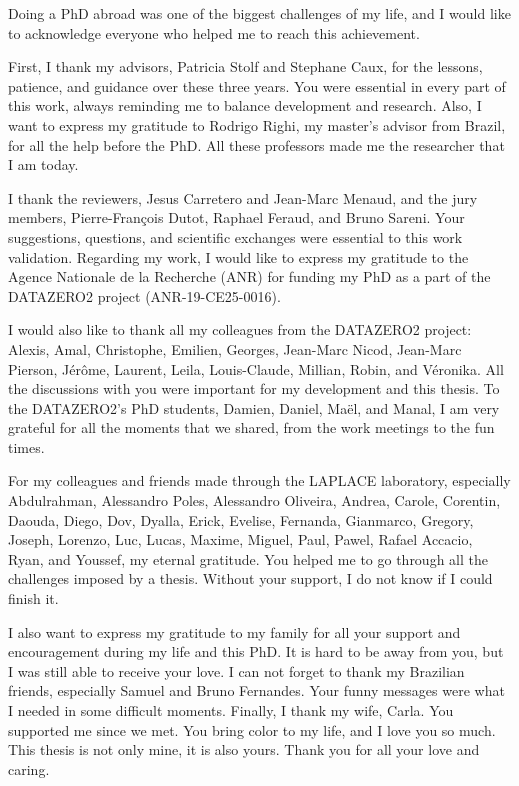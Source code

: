 Doing a PhD abroad was one of the biggest challenges of my life, and I would like to acknowledge everyone who helped me to reach this achievement.

First, I thank my advisors, Patricia Stolf and Stephane Caux, for the lessons, patience, and guidance over these three years. You were essential in every part of this work, always reminding me to balance development and research. Also, I want to express my gratitude to Rodrigo Righi, my master's advisor from Brazil, for all the help before the PhD. All these professors made me the researcher that I am today. 

I thank the reviewers, Jesus Carretero and Jean-Marc Menaud, and the jury members, Pierre-François Dutot, Raphael Feraud, and Bruno Sareni. Your suggestions, questions, and scientific exchanges were essential to this work validation. Regarding my work, I would like to express my gratitude to the Agence Nationale de la Recherche (ANR) for funding my PhD as a part of the DATAZERO2 project (ANR-19-CE25-0016).

I would also like to thank all my colleagues from the DATAZERO2 project: Alexis, Amal, Christophe, Emilien, Georges, Jean-Marc Nicod, Jean-Marc Pierson, Jérôme, Laurent, Leila, Louis-Claude, Millian, Robin, and Véronika. All the discussions with you were important for my development and this thesis. To the DATAZERO2's PhD students, Damien, Daniel, Maël, and Manal, I am very grateful for all the moments that we shared, from the work meetings to the fun times.  

For my colleagues and friends made through the LAPLACE laboratory, especially Abdulrahman, Alessandro Poles, Alessandro Oliveira, Andrea, Carole, Corentin, Daouda, Diego, Dov, Dyalla, Erick, Evelise, Fernanda, Gianmarco, Gregory, Joseph, Lorenzo, Luc, Lucas, Maxime, Miguel, Paul, Pawel, Rafael Accacio, Ryan, and Youssef, my eternal gratitude. You helped me to go through all the challenges imposed by a thesis. Without your support, I do not know if I could finish it. 

I also want to express my gratitude to my family for all your support and encouragement during my life and this PhD. It is hard to be away from you, but I was still able to receive your love. I can not forget to thank my Brazilian friends, especially Samuel and Bruno Fernandes. Your funny messages were what I needed in some difficult moments. Finally, I thank my wife, Carla. You supported me since we met. You bring color to my life, and I love you so much. This thesis is not only mine, it is also yours. Thank you for all your love and caring. 
